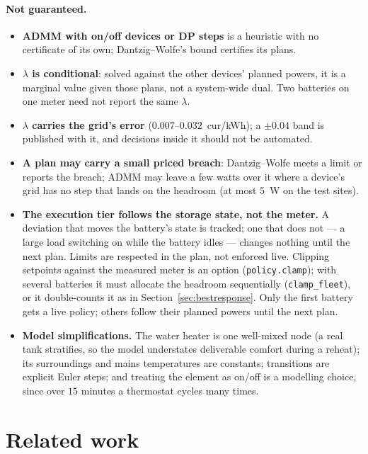 \documentclass[11pt,a4paper]{article}
\begin{document}
\paragraph{Not guaranteed.}
\begin{itemize}[leftmargin=*,itemsep=1pt]
\item \textbf{ADMM with on/off devices or DP steps} is a heuristic with no
  certificate of its own; Dantzig--Wolfe's bound certifies its plans.
\item \textbf{$\lambda$ is conditional}: solved against the other devices'
  planned powers, it is a marginal value given those plans, not a system-wide
  dual. Two batteries on one meter need not report the same $\lambda$.
\item \textbf{$\lambda$ carries the grid's error} ($0.007$--$0.032$~cur/kWh); a
  $\pm 0.04$ band is published with it, and decisions inside it should not be
  automated.
\item \textbf{A plan may carry a small priced breach}: Dantzig--Wolfe meets a
  limit or reports the breach; ADMM may leave a few watts over it where a
  device's grid has no step that lands on the headroom (at most $5$~W on the
  test sites).
\item \textbf{The execution tier follows the storage state, not the meter.} A
  deviation that moves the battery's state is tracked; one that does not --- a
  large load switching on while the battery idles --- changes nothing until the
  next plan. Limits are respected in the plan, not enforced live. Clipping
  setpoints against the measured meter is an option (\texttt{policy.clamp}); with
  several batteries it must allocate the headroom sequentially
  (\texttt{clamp\_fleet}), or it double-counts it as in
  Section~\ref{sec:bestresponse}. Only the first battery gets a live policy;
  others follow their planned powers until the next plan.
\item \textbf{Model simplifications.} The water heater is one well-mixed node (a
  real tank stratifies, so the model understates deliverable comfort during a
  reheat); its surroundings and mains temperatures are constants; transitions
  are explicit Euler steps; and treating the element as on/off is a modelling
  choice, since over $15$ minutes a thermostat cycles many times.
\end{itemize}

\section{Related work}
\label{sec:related}
\end{document}
